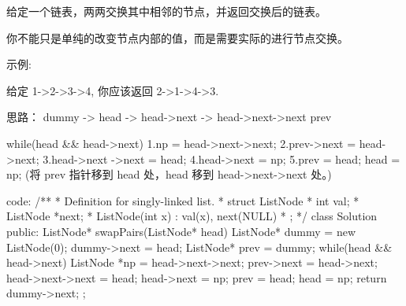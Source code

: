 给定一个链表，两两交换其中相邻的节点，并返回交换后的链表。

你不能只是单纯的改变节点内部的值，而是需要实际的进行节点交换。

 

示例:

给定 1->2->3->4, 你应该返回 2->1->4->3.
































思路：
dummy  ->    head  ->   head->next   ->   head->next->next
prev

while(head && head->next)
1.np = head->next->next;
2.prev->next = head->next;
3.head->next   ->next = head;
4.head->next = np;
5.prev = head; head = np; (将 prev 指针移到 head 处，head 移到  head->next->next 处。)



























code:
/**
 * Definition for singly-linked list.
 * struct ListNode {
 *     int val;
 *     ListNode *next;
 *     ListNode(int x) : val(x), next(NULL) {}
 * };
 */
class Solution {
public:
    ListNode* swapPairs(ListNode* head) {
        ListNode* dummy = new ListNode(0);
        dummy->next = head;
        ListNode* prev = dummy;
        while(head && head->next)
        {
            ListNode *np = head->next->next;
            prev->next = head->next;
            head->next->next = head;
            head->next = np;
            prev = head;
            head = np;
        }
        return dummy->next;
    }
};